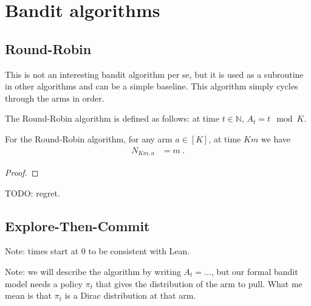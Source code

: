 \chapter{Bandit algorithms}

\section{Round-Robin}

This is not an interesting bandit algorithm per se, but it is used as a subroutine in other algorithms and can be a simple baseline.
This algorithm simply cycles through the arms in order.

\begin{definition}\label{def:roundRobinAlgorithm}
  \leanok
The Round-Robin algorithm is defined as follows: at time $t \in \mathbb{N}$, $A_t = t \mod K$.
\end{definition}


\begin{lemma}\label{lem:pullCount_roundRobinAlgorithm}
  \leanok
For the Round-Robin algorithm, for any arm $a \in [K]$, at time $Km$ we have
\begin{align*}
  N_{Km,a}
  &= m
  \: .
\end{align*}
\end{lemma}

\begin{proof}\leanok

\end{proof}


TODO: regret.




\section{Explore-Then-Commit}

Note: times start at 0 to be consistent with Lean.

Note: we will describe the algorithm by writing $A_t = ...$, but our formal bandit model needs a policy $\pi_t$ that gives the distribution of the arm to pull. What me mean is that $\pi_t$ is a Dirac distribution at that arm.

